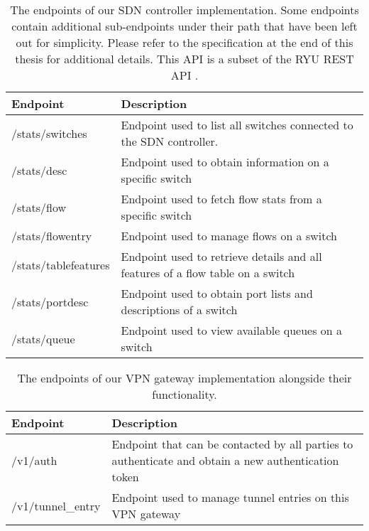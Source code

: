 \begin{table}[htp]
    \begin{tabularx}{\textwidth}{ |l|X| }
        \hline
        \textbf{Endpoint} & \textbf{Description} \\
        \hline
         /stats/switches & Endpoint used to list all switches connected to the SDN controller. \\
         /stats/desc & Endpoint used to obtain information on a specific switch \\
        \hline
         /stats/flow & Endpoint used to fetch flow stats from a specific switch \\
         /stats/flowentry & Endpoint used to manage flows on a switch \\
         /stats/tablefeatures & Endpoint used to retrieve details and all features of a flow table on a switch \\
         /stats/portdesc & Endpoint used to obtain port lists and descriptions of a switch \\
         /stats/queue & Endpoint used to view available queues on a switch \\
        \hline
    \end{tabularx}
    \caption{The endpoints of our SDN controller implementation. Some endpoints contain additional sub-endpoints under their path that have been left out for simplicity. Please refer to the specification at the end of this thesis for additional details. This API is a subset of the RYU REST API \cite{ryu-rest}.}
    \label{table:controller}
\end{table}

\begin{table}[htp]
    \begin{tabularx}{\textwidth}{ |l|X| }
        \hline
        \textbf{Endpoint} & \textbf{Description} \\
        \hline
         /v1/auth & Endpoint that can be contacted by all parties to authenticate and obtain a new authentication token \\
        \hline
         /v1/tunnel\_entry & Endpoint used to manage tunnel entries on this VPN gateway \\
        \hline
    \end{tabularx}
    \caption{The endpoints of our VPN gateway implementation alongside their functionality.}
    \label{table:vpn_gateway}
\end{table}


